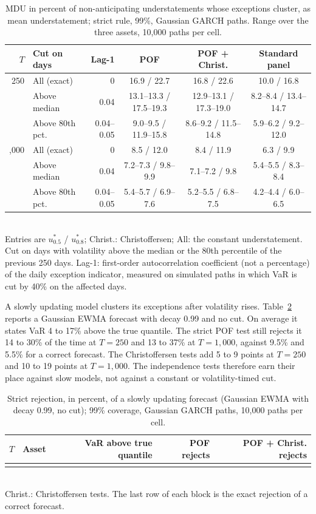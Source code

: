 \documentclass[11pt]{article}
\begin{document}
\begin{table}[tbp]
\caption{MDU in percent of non-anticipating understatements whose exceptions
cluster, as mean understatement; strict rule, 99\%, Gaussian GARCH paths. Range
over the three assets, 10,000 paths per cell.}
\label{tab:cluster}
\footnotesize
\centering
\setlength{\tabcolsep}{2.5pt}
\begin{tabular}{rlrccc}
\toprule
$T$ & Cut on days & Lag-1 & POF & POF + Christ. & Standard panel \\
\midrule
250 & All (exact) & 0 & 16.9 / 22.7 & 16.8 / 22.6 & 10.0 / 16.8 \\
 & Above median & 0.04 & 13.1--13.3 / 17.5--19.3 & 12.9--13.1 / 17.3--19.0 & 8.2--8.4 / 13.4--14.7 \\
 & Above 80th pct. & 0.04--0.05 & 9.0--9.5 / 11.9--15.8 & 8.6--9.2 / 11.5--14.8 & 5.9--6.2 / 9.2--12.0 \\
\addlinespace
1,000 & All (exact) & 0 & 8.5 / 12.0 & 8.4 / 11.9 & 6.3 / 9.9 \\
 & Above median & 0.04 & 7.2--7.3 / 9.8--9.9 & 7.1--7.2 / 9.8 & 5.4--5.5 / 8.3--8.4 \\
 & Above 80th pct. & 0.04--0.05 & 5.4--5.7 / 6.9--7.6 & 5.2--5.5 / 6.8--7.5 & 4.2--4.4 / 6.0--6.5 \\
\bottomrule
\end{tabular}
\\[2pt]
\footnotesize Entries are $u^*_{0.5}$ / $u^*_{0.8}$; Christ.: Christoffersen; All: the constant understatement. Cut on days with volatility above the median or the 80th percentile of the previous 250 days. Lag-1: first-order autocorrelation coefficient (not a percentage) of the daily exception indicator, measured on simulated paths in which VaR is cut by 40\% on the affected days.
\end{table}

A slowly updating model clusters its exceptions after volatility rises.
Table~\ref{tab:slow} reports a Gaussian EWMA forecast with decay 0.99 and no
cut. On average it states VaR 4 to 17\% above the true quantile. The strict POF
test still rejects it 14 to 30\% of the time at $T = 250$ and 13 to 37\% at
$T = 1{,}000$, against 9.5\% and 5.5\% for a correct forecast. The Christoffersen tests add 5 to 9
points at $T = 250$ and 10 to 19 points at $T = 1{,}000$. The independence
tests therefore earn their place against slow models, not against a constant
or volatility-timed cut.

\begin{table}[tbp]
\caption{Strict rejection, in percent, of a slowly updating forecast (Gaussian
EWMA with decay 0.99, no cut); 99\% coverage, Gaussian GARCH paths, 10,000
paths per cell.}
\label{tab:slow}
\small
\centering
\begin{tabular}{rlrrr}
\toprule
$T$ & Asset & VaR above true quantile & POF rejects & POF + Christ. rejects \\
\midrule
\\
\bottomrule
\end{tabular}
\\[2pt]
\footnotesize Christ.: Christoffersen tests. The last row of each block is the
exact rejection of a correct forecast.
\end{table}
\end{document}
